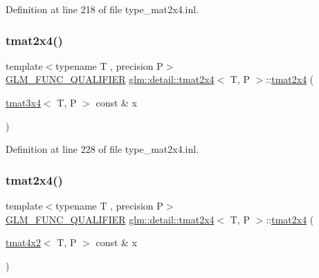 Definition at line 218 of file type\+\_\+mat2x4.\+inl.

\mbox{\label{structglm_1_1detail_1_1tmat2x4_a4366b68e3fe9368c0b8815ffd54c2a86}} 
\subsubsection{\texorpdfstring{tmat2x4()}{tmat2x4()}\hspace{0.1cm}{\footnotesize\ttfamily [16/22]}}
{\footnotesize\ttfamily template$<$typename T , precision P$>$ \\
\hyperlink{setup_8hpp_a33fdea6f91c5f834105f7415e2a64407}{G\+L\+M\+\_\+\+F\+U\+N\+C\+\_\+\+Q\+U\+A\+L\+I\+F\+I\+ER} \hyperlink{structglm_1_1detail_1_1tmat2x4}{glm\+::detail\+::tmat2x4}$<$ T, P $>$\+::\hyperlink{structglm_1_1detail_1_1tmat2x4}{tmat2x4} (\begin{DoxyParamCaption}\item[{\hyperlink{structglm_1_1detail_1_1tmat3x4}{tmat3x4}$<$ T, P $>$ const \&}]{x }\end{DoxyParamCaption})\hspace{0.3cm}{\ttfamily [explicit]}}



Definition at line 228 of file type\+\_\+mat2x4.\+inl.

\mbox{\label{structglm_1_1detail_1_1tmat2x4_a758d4611a4d501821627c8bfbc4e842e}} 
\subsubsection{\texorpdfstring{tmat2x4()}{tmat2x4()}\hspace{0.1cm}{\footnotesize\ttfamily [17/22]}}
{\footnotesize\ttfamily template$<$typename T , precision P$>$ \\
\hyperlink{setup_8hpp_a33fdea6f91c5f834105f7415e2a64407}{G\+L\+M\+\_\+\+F\+U\+N\+C\+\_\+\+Q\+U\+A\+L\+I\+F\+I\+ER} \hyperlink{structglm_1_1detail_1_1tmat2x4}{glm\+::detail\+::tmat2x4}$<$ T, P $>$\+::\hyperlink{structglm_1_1detail_1_1tmat2x4}{tmat2x4} (\begin{DoxyParamCaption}\item[{\hyperlink{structglm_1_1detail_1_1tmat4x2}{tmat4x2}$<$ T, P $>$ const \&}]{x }\end{DoxyParamCaption})\hspace{0.3cm}{\ttfamily [explicit]}}



